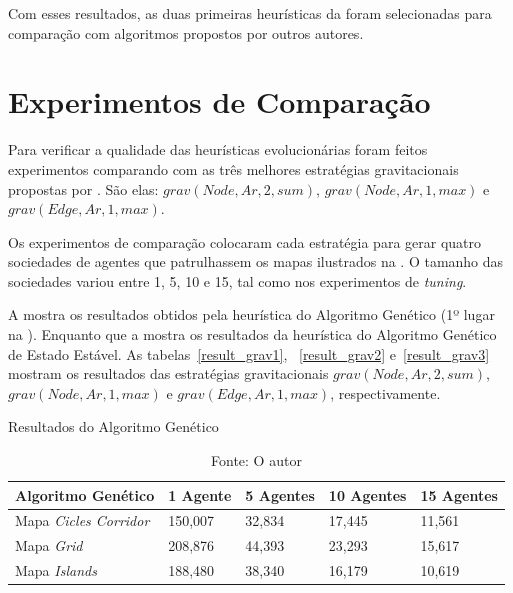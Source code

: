 Com esses resultados, as duas primeiras heurísticas da  foram 
selecionadas para comparação com algoritmos propostos por outros autores.

\section{Experimentos de Comparação}

Para verificar a qualidade das heurísticas evolucionárias foram feitos 
experimentos comparando com as três melhores estratégias gravitacionais 
propostas por \citep{sampaiophd}. São elas: $grav(Node,Ar,2,sum)$, 
$grav(Node,Ar,1,max)$ e $grav(Edge,Ar,1,max)$.

Os experimentos de comparação colocaram cada estratégia para gerar quatro 
sociedades de agentes que patrulhassem os mapas ilustrados na 
. O tamanho das sociedades variou entre 1, 5, 10 e 15, tal 
como nos experimentos de \textit{tuning}.

A  mostra os resultados obtidos pela heurística do 
Algoritmo Genético (1º lugar na ). Enquanto que a 
 mostra os resultados da heurística do Algoritmo 
Genético de Estado Estável. As tabelas~\ref{result_grav1}, ~\ref{result_grav2} 
e~\ref{result_grav3} mostram os resultados das estratégias gravitacionais 
$grav(Node,Ar,2,sum)$, $grav(Node,Ar,1,max)$ e $grav(Edge,Ar,1,max)$, respectivamente.

\begin{table}
	\centering
	\caption{Resultados do Algoritmo Genético}
	\label{result_genetic}
	\begin{tabularx}{\linewidth}{|X|X|X|X|X|}
		\hline
		\textbf{Algoritmo Genético} & \textbf{1 Agente} & \textbf{5 Agentes} & \textbf{10 Agentes} & \textbf{15 Agentes} \\
		\hline
		Mapa \textit{Cicles Corridor} & 150,007 & 32,834 & 17,445 & 11,561 \\
		\hline
		Mapa \textit{Grid} & 208,876 & 44,393 & 23,293 & 15,617 \\
		\hline
		Mapa \textit{Islands} & 188,480 & 38,340 & 16,179 & 10,619 \\
		\hline
	\end{tabularx}
	\caption*{Fonte: O autor}
\end{table}

